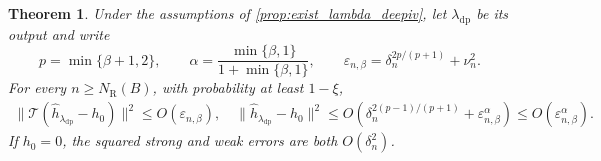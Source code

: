 \documentclass[12pt]{article}
\theoremstyle{plain}
\newtheorem{theorem}{Theorem}[section]
\theoremstyle{definition}
\theoremstyle{remark}
\begin{document}
\begin{theorem}\label{thm:deepiv_rate}
Under the assumptions of \cref{prop:exist_lambda_deepiv}, let $\lambda_{\mathrm{dp}}$ be its output and write
\[
p=\min\{\beta+1,2\},
\qquad
\alpha=\frac{\min\{\beta,1\}}{1+\min\{\beta,1\}},
\qquad
\varepsilon_{n,\beta}=\delta_n^{2p/(p+1)}+\nu_n^2.
\]
For every $n\geqslant N_{\mathrm R}(B)$, with probability at least $1-\xi$,
\begin{align*}
\|\mathcal T(\hat h_{\lambda_{\mathrm{dp}}}-h_0)\|^2
\leqslant O(\varepsilon_{n,\beta}), \quad \|\hat h_{\lambda_{\mathrm{dp}}}-h_0\|^2
\leqslant O\!\left(
\delta_n^{2(p-1)/(p+1)}
+\varepsilon_{n,\beta}^{\alpha}\right)
\leqslant O(\varepsilon_{n,\beta}^\alpha).
\end{align*}
If $h_0=0$, the squared strong and weak errors are both $O(\delta_n^2)$.


\end{theorem}
\end{document}
